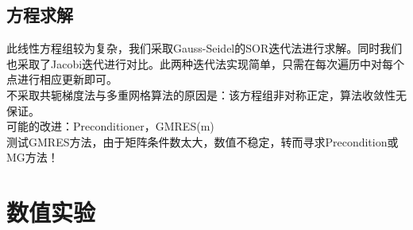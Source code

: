 \documentclass[11pt,a4 paper,one side]{article}
\begin{document}
\subsection{方程求解}
此线性方程组较为复杂，我们采取Gauss-Seidel的SOR迭代法进行求解。同时我们也采取了Jacobi迭代进行对比。此两种迭代法实现简单，只需在每次遍历中对每个点进行相应更新即可。
\\ 不采取共轭梯度法与多重网格算法的原因是：该方程组非对称正定，算法收敛性无保证。
\\ 可能的改进：Preconditioner，GMRES(m)
\\ 测试GMRES方法，由于矩阵条件数太大，数值不稳定，转而寻求Precondition或MG方法！
\section{数值实验}
\end{document}
